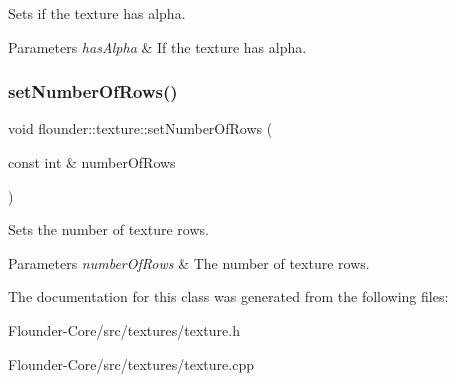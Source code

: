 Sets if the texture has alpha. 


\begin{DoxyParams}{Parameters}
{\em has\+Alpha} & If the texture has alpha. \\
\hline
\end{DoxyParams}
\mbox{\label{classflounder_1_1texture_ac0854bbd1a260380db88f378b408aa18}} 
\subsubsection{\texorpdfstring{set\+Number\+Of\+Rows()}{setNumberOfRows()}}
{\footnotesize\ttfamily void flounder\+::texture\+::set\+Number\+Of\+Rows (\begin{DoxyParamCaption}\item[{const int \&}]{number\+Of\+Rows }\end{DoxyParamCaption})\hspace{0.3cm}{\ttfamily [inline]}}



Sets the number of texture rows. 


\begin{DoxyParams}{Parameters}
{\em number\+Of\+Rows} & The number of texture rows. \\
\hline
\end{DoxyParams}


The documentation for this class was generated from the following files\+:\begin{DoxyCompactItemize}
\item 
Flounder-\/\+Core/src/textures/texture.\+h\item 
Flounder-\/\+Core/src/textures/texture.\+cpp\end{DoxyCompactItemize}
